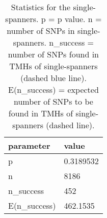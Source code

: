\begin{table}

\caption{\label{tab:snp_stats_per_spanner_single}Statistics for the single-spanners. p = p value. n = number of SNPs in single-spanners. n\_success = number of SNPs found in TMHs of single-spanners (dashed blue line). E(n\_success) = expected number of SNPs to be found in TMHs of single-spanners  (dashed line). }
\centering
\begin{tabular}[t]{l|l}
\hline
parameter & value\\
\hline
p & 0.3189532\\
\hline
n & 8186\\
\hline
n\_success & 452\\
\hline
E(n\_success) & 462.1535\\
\hline
\end{tabular}
\end{table}
